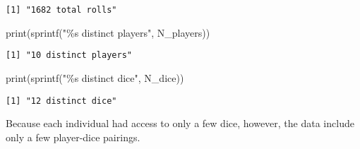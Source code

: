 \documentclass[
  letterpaper,
  DIV=11,
  numbers=noendperiod]{scrartcl}
\newenvironment{Shaded}{\begin{snugshade}}{\end{snugshade}}
\newcommand{\FunctionTok}[1]{\textcolor[rgb]{0.28,0.35,0.67}{#1}}
\newcommand{\NormalTok}[1]{\textcolor[rgb]{0.00,0.23,0.31}{#1}}
\newcommand{\StringTok}[1]{\textcolor[rgb]{0.13,0.47,0.30}{#1}}
\begin{document}
\begin{verbatim}
[1] "1682 total rolls"
\end{verbatim}

\begin{Shaded}
\begin{Highlighting}[]
\FunctionTok{print}\NormalTok{(}\FunctionTok{sprintf}\NormalTok{(}\StringTok{"\%s distinct players"}\NormalTok{, N\_players))}
\end{Highlighting}
\end{Shaded}

\begin{verbatim}
[1] "10 distinct players"
\end{verbatim}

\begin{Shaded}
\begin{Highlighting}[]
\FunctionTok{print}\NormalTok{(}\FunctionTok{sprintf}\NormalTok{(}\StringTok{"\%s distinct dice"}\NormalTok{, N\_dice))}
\end{Highlighting}
\end{Shaded}

\begin{verbatim}
[1] "12 distinct dice"
\end{verbatim}

Because each individual had access to only a few dice, however, the data
include only a few player-dice pairings.
\end{document}
